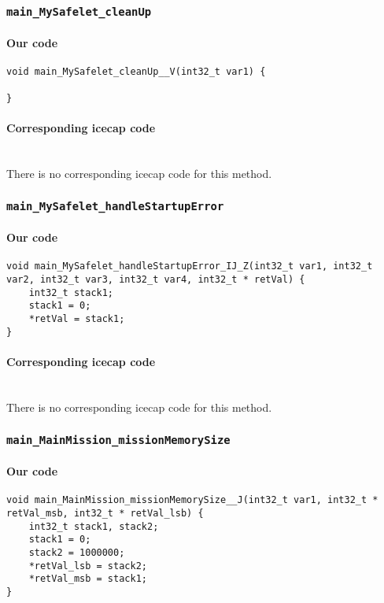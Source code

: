 \subsubsection{\texttt{main\_MySafelet\_cleanUp}}

\paragraph{Our code}\hfill
\begin{lstlisting}[firstnumber=658]
void main_MySafelet_cleanUp__V(int32_t var1) {
	
}
\end{lstlisting}

\paragraph{Corresponding icecap code}\hfill\\
There is no corresponding icecap code for this method.


\subsubsection{\texttt{main\_MySafelet\_handleStartupError}}

\paragraph{Our code}\hfill
\begin{lstlisting}[firstnumber=1183]
void main_MySafelet_handleStartupError_IJ_Z(int32_t var1, int32_t var2, int32_t var3, int32_t var4, int32_t * retVal) {
	int32_t stack1;
	stack1 = 0;
	*retVal = stack1;
}
\end{lstlisting}

\paragraph{Corresponding icecap code}\hfill\\
There is no corresponding icecap code for this method.


\subsubsection{\texttt{main\_MainMission\_missionMemorySize}}

\paragraph{Our code}\hfill
\begin{lstlisting}[firstnumber=1262]
void main_MainMission_missionMemorySize__J(int32_t var1, int32_t * retVal_msb, int32_t * retVal_lsb) {
	int32_t stack1, stack2;
	stack1 = 0;
	stack2 = 1000000;
	*retVal_lsb = stack2;
	*retVal_msb = stack1;
}  
\end{lstlisting}

